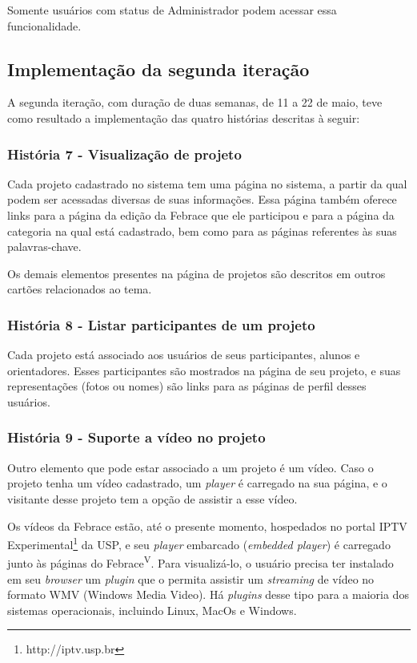       Somente usuários com status de Administrador podem acessar essa funcionalidade.

  \subsection{Implementação da segunda iteração}
    A segunda iteração, com duração de duas semanas, de 11 a 22 de maio, teve como resultado a implementação das quatro histórias descritas à seguir:

    \subsubsection{História 7 - Visualização de projeto}
      Cada projeto cadastrado no sistema tem uma página no sistema, a partir da qual podem ser acessadas diversas de suas informações. Essa página também oferece links para a página da edição da Febrace que ele participou e para a página da categoria na qual está cadastrado, bem como para as páginas referentes às suas palavras-chave.

      Os demais elementos presentes na página de projetos são descritos em outros cartões relacionados ao tema.

    \subsubsection{História 8 - Listar participantes de um projeto}
      Cada projeto está associado aos usuários de seus participantes, alunos e orientadores. Esses participantes são mostrados na página de seu projeto, e suas representações (fotos ou nomes) são links para as páginas de perfil desses usuários.

    \subsubsection{História 9 - Suporte a vídeo no projeto}
      Outro elemento que pode estar associado a um projeto é um vídeo. Caso o projeto tenha um vídeo cadastrado, um \textit{player} é carregado na sua página, e o visitante desse projeto tem a opção de assistir a esse vídeo.

      Os vídeos da Febrace estão, até o presente momento, hospedados no portal IPTV Experimental\footnote{http://iptv.usp.br} da USP, e seu \textit{player} embarcado (\textit{embedded player}) é carregado junto às páginas do Febrace\textsuperscript{V}. Para visualizá-lo, o usuário precisa ter instalado em seu \textit{browser} um \textit{plugin} que o permita assistir um \textit{streaming} de vídeo no formato WMV (Windows Media Video). Há \textit{plugins} desse tipo para a maioria dos sistemas operacionais, incluindo Linux, MacOs e Windows.

